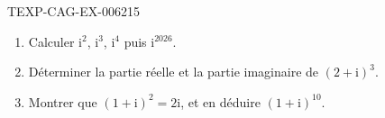 \begin{exercice}{TEXP-CAG-EX-006}{2}{15}
\begin{enumerate}
  \item Calculer $\mathrm{i}^{2}$, $\mathrm{i}^{3}$, $\mathrm{i}^{4}$ puis
        $\mathrm{i}^{2026}$.
  \item Déterminer la partie réelle et la partie imaginaire de
        $(2+\mathrm{i})^3$.
  \item Montrer que $(1+\mathrm{i})^2=2\mathrm{i}$, et en déduire
        $(1+\mathrm{i})^{10}$.
\end{enumerate}
\end{exercice}
